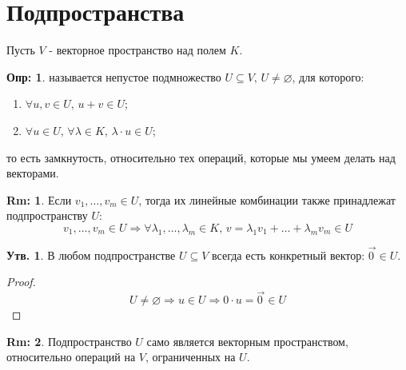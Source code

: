 \documentclass[12pt]{article}
\newcommand{\VN}{\varnothing}
\theoremstyle{definition}
\newtheorem{defn}{Опр:}
\newtheorem{rem}{Rm:}
\newtheorem{prop}{Утв.}
\newcommand{\vecm}[1]{\overrightarrow{#1\,}}
\begin{document}
\section*{Подпространства}
Пусть $V$ - векторное пространство над полем $K$.
\begin{defn}
	 называется непустое подмножество $U \subseteq V, \, U \neq \VN$, для которого:
	\begin{enumerate}[label=\arabic*)]
		\item $\forall u,v \in U, \, u + v \in U$;
		\item $\forall u \in U, \, \forall \lambda \in K, \, \lambda{\cdot}u \in U$;
	\end{enumerate}
	то есть замкнутость, относительно тех операций, которые мы умеем делать над векторами.
\end{defn}
\begin{rem}
	Если $v_1, \dotsc, v_m \in U$, тогда их линейные комбинации также принадлежат подпространству $U$: 
	$$
		v_1, \dotsc, v_m \in U \Rightarrow \forall \lambda_1, \dotsc, \lambda_m \in K, \, v = \lambda_1 v_1 + \dotsc + \lambda_m v_m \in U
	$$
\end{rem}
\begin{prop}
	В любом подпространстве $U \subseteq V$ всегда есть конкретный вектор: $\vecm{0} \in U$.
\end{prop}
\begin{proof}
	$$
		U \neq \VN \Rightarrow u \in U \Rightarrow  0{\cdot}u = \vecm{0} \in U 
	$$
\end{proof}
\begin{rem}
	Подпространство $U$ само является векторным пространством, относительно операций на $V$, ограниченных на $U$.
\end{rem}
\end{document}
